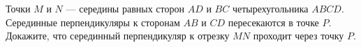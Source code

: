 Точки $M$ и $N$ --- середины равных сторон $AD$ и $BC$ четырехугольника $ABCD$. Серединные перпендикуляры к сторонам $AB$ и $CD$ пересекаются в точке $P$. Докажите, что серединный перпендикуляр к отрезку $MN$ проходит через точку $P$.